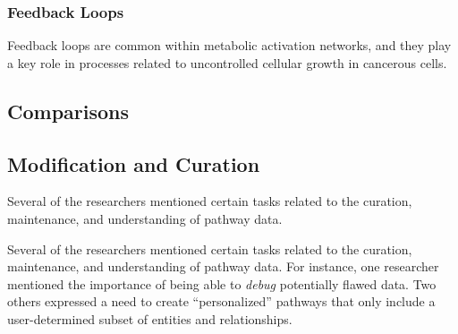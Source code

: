 \documentclass[journal]{vgtc}                %
\begin{document}
\subsubsection{Feedback Loops}

Feedback loops are common within metabolic activation networks, and they play a key role in processes related to uncontrolled cellular growth in cancerous cells.

\subsection{Comparisons}


\subsection{Modification and Curation}

Several of the researchers mentioned certain tasks related to the curation, maintenance, and understanding of pathway data.

Several of the researchers mentioned certain tasks related to the curation, maintenance, and understanding of pathway data. For instance, one researcher mentioned the importance of being able to \emph{debug} potentially flawed data. Two others expressed a need to create ``personalized'' pathways that only include a user-determined subset of entities and relationships.




\end{document}
